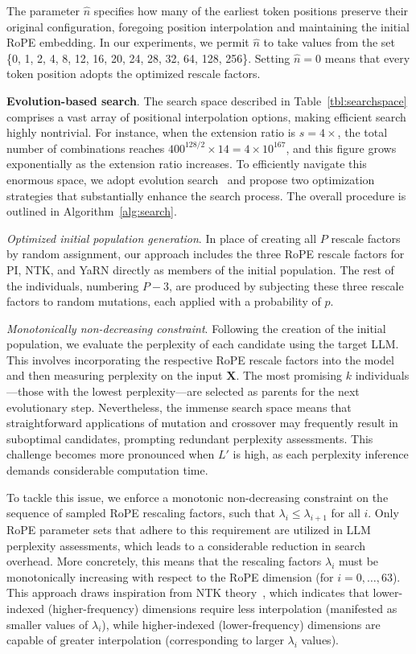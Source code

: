 The parameter $\hat{n}$ specifies how many of the earliest token positions preserve their original configuration, foregoing position interpolation and maintaining the initial RoPE embedding. In our experiments, we permit $\hat{n}$ to take values from the set \{0, 1, 2, 4, 8, 12, 16, 20, 24, 28, 32, 64, 128, 256\}. Setting $\hat{n}=0$ means that every token position adopts the optimized rescale factors.

\textbf{Evolution-based search}. The search space described in Table~\ref{tbl:searchspace} comprises a vast array of positional interpolation options, making efficient search highly nontrivial. For instance, when the extension ratio is $s=4\times$, the total number of combinations reaches $400^{128/2}\times14 = 4\times10^{167}$, and this figure grows exponentially as the extension ratio increases. To efficiently navigate this enormous space, we adopt evolution search~\cite{guo2020single} and propose two optimization strategies that substantially enhance the search process. The overall procedure is outlined in Algorithm~\ref{alg:search}.

\textit{Optimized initial population generation}. In place of creating all $P$ rescale factors by random assignment, our approach includes the three RoPE rescale factors for PI, NTK, and YaRN directly as members of the initial population. The rest of the individuals, numbering $P-3$, are produced by subjecting these three rescale factors to random mutations, each applied with a probability of $p$.

\textit{Monotonically non-decreasing constraint}. Following the creation of the initial population, we evaluate the perplexity of each candidate using the target LLM. This involves incorporating the respective RoPE rescale factors into the model and then measuring perplexity on the input $\mathbf{X}$. The most promising $k$ individuals—those with the lowest perplexity—are selected as parents for the next evolutionary step. Nevertheless, the immense search space means that straightforward applications of mutation and crossover may frequently result in suboptimal candidates, prompting redundant perplexity assessments. This challenge becomes more pronounced when $L'$ is high, as each perplexity inference demands considerable computation time.

To tackle this issue, we enforce a monotonic non-decreasing constraint on the sequence of sampled RoPE rescaling factors, such that $\lambda_i \le \lambda_{i+1}$ for all $i$. Only RoPE parameter sets that adhere to this requirement are utilized in LLM perplexity assessments, which leads to a considerable reduction in search overhead. More concretely, this means that the rescaling factors $\lambda_i$ must be monotonically increasing with respect to the RoPE dimension (for $i = 0,\ldots,63$). This approach draws inspiration from NTK theory~\cite{jacot2018neural,tancik2020fourier,ntk}, which indicates that lower-indexed (higher-frequency) dimensions require less interpolation (manifested as smaller values of $\lambda_i$), while higher-indexed (lower-frequency) dimensions are capable of greater interpolation (corresponding to larger $\lambda_i$ values).

